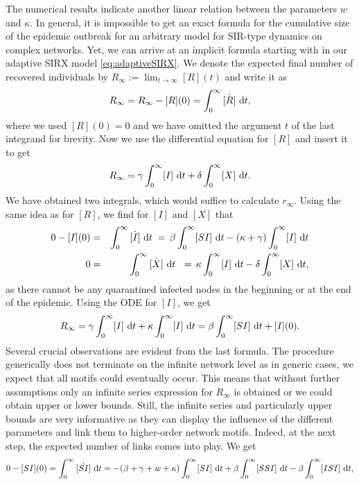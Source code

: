 \documentclass[12pt]{article}
\def\txtd{{\textnormal{d}}}
\def\I{\infty}
\begin{document}
The numerical results indicate another linear relation between the parameters $w$ and $\kappa$. In general, it is impossible to get an exact formula for the cumulative size of the epidemic outbreak for an arbitrary model for SIR-type dynamics on complex networks. Yet, we can arrive at an implicit formula starting with in our adaptive SIRX model \eqref{eq:adaptiveSIRX}. We denote the expected final number of recovered individuals by $R_\I:=\lim_{t\to\infty}[R](t)$ and write it as
\begin{equation*}
    R_\I=R_\I-[R](0)=\int_0^\infty \dot{[R]}~\txtd t,
\end{equation*}
where we used $[R](0)=0$ and we have omitted the argument $t$ of the last integrand for brevity. Now we use the differential equation for $[R]$ and insert it to get 
\begin{equation*}
    R_\I=\gamma \int_0^\infty  [I]~\txtd t + \delta\int_0^\I [X]~\txtd t.
\end{equation*}
We have obtained two integrals, which would suffice to calculate $r_\I$. Using the same idea as for $[R]$, we find for $[I]$ and $[X]$ that
\begin{eqnarray*}
    0-[I](0)&=&\int_0^\infty  \dot{[I]}~\txtd t \;=\,\beta\int_0^\infty[SI]~\txtd t - (\kappa+\gamma)\int_0^\infty[I]~\txtd t\\
    0&=&\int_0^\infty  \dot{[X]}~\txtd t ~ \;=\, \kappa\int_0^\infty[I]~\txtd t -\delta\int_0^\infty[X]~\txtd t,
\end{eqnarray*}
as there cannot be any quarantined infected nodes in the beginning or at the end of the epidemic. Using the ODE for $[I]$, we get
\begin{equation*}
    R_\I=\gamma\int_0^\infty [I] ~\txtd t +\kappa\int_0^\infty [I] ~\txtd t = \beta \int_0^\infty [SI]~\txtd t + [I](0).
\end{equation*}
Several crucial observations are evident from the last formula. The procedure generically does not terminate on the infinite network level as in generic cases, we expect that all motifs could eventually occur. This means that without further assumptions only an infinite series expression for $R_\I$ is obtained or we could obtain upper or lower bounds. Still, the infinite series and particularly upper bounds are very informative as they can display the influence of the different parameters  and link them to higher-order network motifs. Indeed, at the next step, the expected number of links comes into play. We get
\begin{equation*}
0-[SI](0)=\int_0^\I \dot{[SI]}~\txtd t=
 -(\beta+\gamma+w+\kappa)\int_0^\I [SI]~\txtd t + \beta\int_0^\I[SSI]~\txtd t -\beta\int_0^\I [ISI]~\txtd t,
 \end{equation*}
\end{document}
